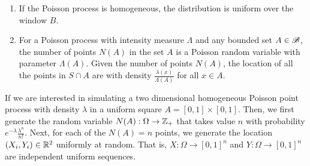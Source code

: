 \documentclass[letterpaper,10pt,english]{article}
\begin{document}
\begin{rem}
\begin{enumerate}[i\_]
\item If the Poisson process is homogeneous, the distribution is uniform over the window $B$. 
\item For a Poisson process with intensity measure $\Lambda$ and any bounded set $A \in \mathscr{B}$, 
the number of points $N(A)$ in the set $A$ is a Poisson random variable with parameter $\Lambda(A)$. 
Given the number of points $N(A)$, the location of all the points in $S\cap A$ are \iid with density $\frac{\lambda(x)}{\Lambda(A)}$ for all $x \in A$. 
\end{enumerate}
\end{rem}
\begin{shaded}
\begin{rem} 
If we are interested in simulating a two dimensional homogeneous Poisson point process with density $\lambda$ in a uniform square $A = [0,1]\times[0,1]$. 
Then, we first generate the random variable $N(A):\Omega\to\mathbb{Z}_+$ that takes value $n$ with probability $e^{-\lambda}\frac{\lambda^n}{n!}$. 
Next, for each of the $N(A)=n$ points, we generate the location $(X_i, Y_i) \in \mathbb{R}^2$ uniformly at random. 
That is, $X:\Omega\to[0,1]^n$ and $Y:\Omega\to[0,1]^n$ are independent \iid uniform sequences.
\end{rem}
\end{shaded}
\end{document}
